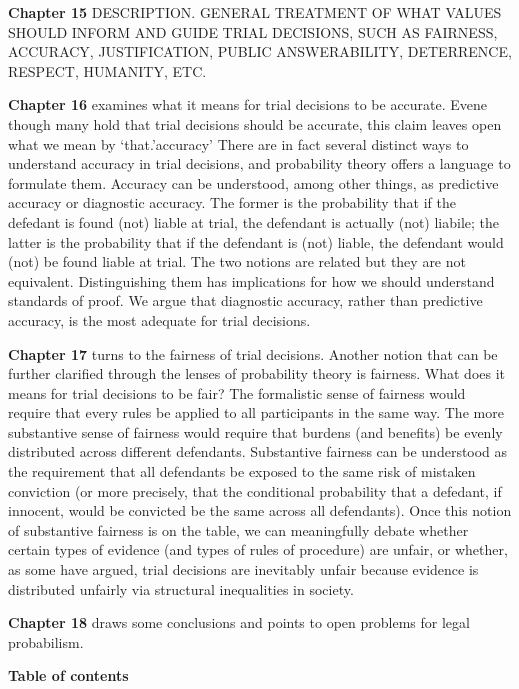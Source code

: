 \documentclass[10pt,dvipsnames,enabledeprecatedfontcommands]{scrartcl}
\begin{document}
\textbf{Chapter 15} DESCRIPTION. GENERAL TREATMENT OF WHAT VALUES SHOULD
INFORM AND GUIDE TRIAL DECISIONS, SUCH AS FAIRNESS, ACCURACY,
JUSTIFICATION, PUBLIC ANSWERABILITY, DETERRENCE, RESPECT, HUMANITY, ETC.

\textbf{Chapter 16} examines what it means for trial decisions to be
accurate. Evene though many hold that trial decisions should be
accurate, this claim leaves open what we mean by `that.'accuracy' There
are in fact several distinct ways to understand accuracy in trial
decisions, and probability theory offers a language to formulate them.
Accuracy can be understood, among other things, as predictive accuracy
or diagnostic accuracy. The former is the probability that if the
defedant is found (not) liable at trial, the defendant is actually (not)
liabile; the latter is the probability that if the defendant is (not)
liable, the defendant would (not) be found liable at trial. The two
notions are related but they are not equivalent. Distinguishing them has
implications for how we should understand standards of proof. We argue
that diagnostic accuracy, rather than predictive accuracy, is the most
adequate for trial decisions.

\textbf{Chapter 17} turns to the fairness of trial decisions. Another
notion that can be further clarified through the lenses of probability
theory is fairness. What does it means for trial decisions to be fair?
The formalistic sense of fairness would require that every rules be
applied to all participants in the same way. The more substantive sense
of fairness would require that burdens (and benefits) be evenly
distributed across different defendants. Substantive fairness can be
understood as the requirement that all defendants be exposed to the same
risk of mistaken conviction (or more precisely, that the conditional
probability that a defedant, if innocent, would be convicted be the same
across all defendants). Once this notion of substantive fairness is on
the table, we can meaningfully debate whether certain types of evidence
(and types of rules of procedure) are unfair, or whether, as some have
argued, trial decisions are inevitably unfair because evidence is
distributed unfairly via structural inequalities in society.

\textbf{Chapter 18} draws some conclusions and points to open problems
for legal probabilism. 

\vspace{3mm} \noindent
\textbf{Table of contents}
\end{document}
